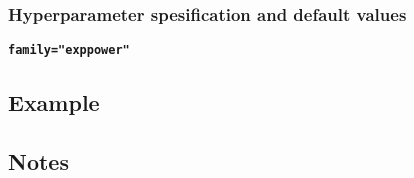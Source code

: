 \documentclass[a4paper,11pt]{article}
\begin{document}
\subsubsection*{Hyperparameter spesification and default values}
\textbf{\texttt{family="exppower"}}


\subsection*{Example}



\subsection*{Notes}
\end{document}
